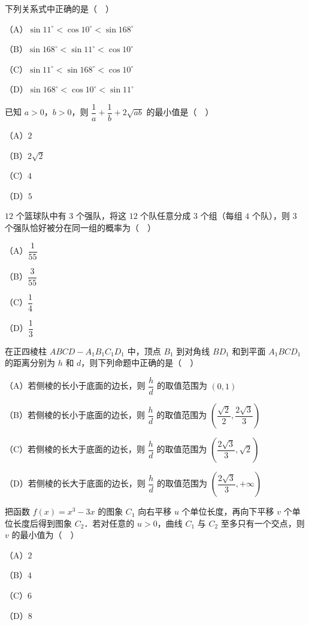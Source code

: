 \begin{question}
下列关系式中正确的是（　）

（A）$\sin11^\circ<\cos10^\circ<\sin168^\circ$

（B）$\sin168^\circ<\sin11^\circ<\cos10^\circ$

（C）$\sin11^\circ<\sin168^\circ<\cos10^\circ$

（D）$\sin168^\circ<\cos10^\circ<\sin11^\circ$

\end{question}
\begin{question}
已知 $a>0$，$b>0$，则 $\dfrac1a+\dfrac1b+2\sqrt{ab}$ 的最小值是（　）

（A）$2$

（B）$2\sqrt2$

（C）$4$

（D）$5$

\end{question}
\begin{question}
$12$ 个篮球队中有 $3$ 个强队，将这 $12$ 个队任意分成 $3$ 个组（每组 $4$ 个队），则 $3$ 个强队恰好被分在同一组的概率为（　）

（A）$\dfrac1{55}$

（B）$\dfrac3{55}$

（C）$\dfrac14$

（D）$\dfrac13$

\end{question}
\begin{question}
在正四棱柱 $ABCD-A_1B_1C_1D_1$ 中，顶点 $B_1$ 到对角线 $BD_1$ 和到平面 $A_1BCD_1$ 的距离分别为 $h$ 和 $d$，则下列命题中正确的是（　）

（A）若侧棱的长小于底面的边长，则 $\dfrac hd$ 的取值范围为 $(0,1)$

（B）若侧棱的长小于底面的边长，则 $\dfrac hd$ 的取值范围为 $\left(\dfrac{\sqrt2}2,\dfrac{2\sqrt3}3\right)$

（C）若侧棱的长大于底面的边长，则 $\dfrac hd$ 的取值范围为 $\left(\dfrac{2\sqrt3}3,\sqrt2\right)$

（D）若侧棱的长大于底面的边长，则 $\dfrac hd$ 的取值范围为 $\left(\dfrac{2\sqrt3}3,+\infty\right)$

\end{question}
\begin{question}
把函数 $f(x)=x^3-3x$ 的图象 $C_1$ 向右平移 $u$ 个单位长度，再向下平移 $v$ 个单位长度后得到图象 $C_2$．若对任意的 $u>0$，曲线 $C_1$ 与 $C_2$ 至多只有一个交点，则 $v$ 的最小值为（　）

（A）$2$

（B）$4$

（C）$6$

（D）$8$

\end{question}

